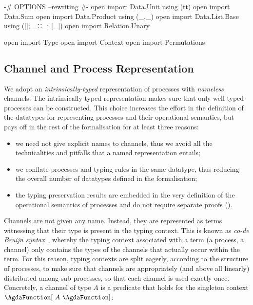 \begin{code}[hide]
{-# OPTIONS --rewriting #-}
open import Data.Unit using (tt)
open import Data.Sum
open import Data.Product using (_,_)
open import Data.List.Base using ([]; _∷_; [_])
open import Relation.Unary

open import Type
open import Context
open import Permutations
\end{code}

\subsection{Channel and Process Representation}
\label{sec:process-agda}

We adopt an \emph{intrinsically-typed} representation of processes with
\emph{nameless} channels. The intrinsically-typed representation makes sure that
only well-typed processes can be constructed. This choice increases the effort
in the definition of the datatypes for representing processes and their
operational semantics, but pays off in the rest of the formalisation for at
least three reasons:
\begin{itemize}
\item we need not give explicit names to channels, thus we avoid all the
  technicalities and pitfalls that a named representation entails;
\item we conflate processes and typing rules in the same datatype, thus reducing
  the overall number of datatypes defined in the formalisation;
\item the typing preservation results are embedded in the very definition of the
  operational semantics of processes and do not require separate proofs
  ().
\end{itemize}

Channels are not given any name. Instead, they are represented as terms
witnessing that their type is present in the typing context. This is known as
\emph{co-de Bruijn syntax}~\cite{McBride18}, whereby the typing context
associated with a term (a process, a channel) only contains the types of the
channels that actually occur within the term. For this reason, typing contexts
are split eagerly, according to the structure of processes, to make sure that
channels are appropriately (and above all linearly) distributed among
sub-processes, so that each channel is used exactly once.
%
Concretely, a channel of type $A$ is a predicate that holds for the singleton
context $\AgdaFunction[~A~\AgdaFunction]$:

